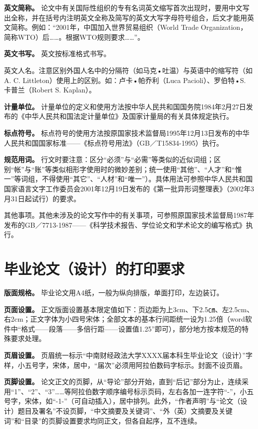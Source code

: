 \documentclass[doublesided]{Style/ucasthesis}%
\begin{document}
\textbf{英文简称。} 论文中有关国际性组织的专有名词英文缩写首次出现时，要用中文写出全称，并在括号内注明英文全称及简写的英文大写字母符号组合，后文才能用英文简称。例如：``2001年，中国加入世界贸易组织（World Trade Organization，简称WTO）后\ldots{}\ldots{}。根据WTO规则要求\ldots{}\ldots{}''。

\textbf{英文书写。} 英文按标准格式书写。

英文人名。注意区别外国人名中的分隔符（如马克•吐温）与英语中的缩写符（如A. C. Littleton）使用上的区别。如：卢卡•帕乔利（Luca Pacioli）、罗伯特•S. 卡普兰（Robert S. Kaplan）。

\textbf{计量单位。} 计量单位的定义和使用方法按中华人民共和国国务院1984年2月27日发布的《中华人民共和国法定计量单位》及国家计量局的有关具体规定执行。

\textbf{标点符号。} 标点符号的使用方法按原国家技术监督局1995年12月13日发布的中华人民共和国国家标准------《标点符号用法》（GB／T15834-1995）执行。

\textbf{规范用词。} 行文时要注意：区分``必须''与``必需''等类似的近似词组；区别``帐''与``账''等类似相形字使用时的微妙差别；统一使用``其他''、``人才''和``惟一''等词组，不得使用``其它''、``人材''和``唯一''）。具体用法可参照中华人民共和国国家语言文字工作委员会2001年12月19日发布的《第一批异形词整理表》（2002年3月31日起试行）的要求。

其他事项。其他未涉及的论文写作中的有关事项，可参照原国家技术监督局1987年发布的GB／7713-1987------《科学技术报告、学位论文和学术论文的编写格式》执行。

\hypertarget{section-34}{%
\section{毕业论文（设计）的打印要求}\label{section-34}}

\textbf{版面规格。} 毕业论文用A4纸，一般为纵向排版，单面打印，左边装订。

\textbf{页面设置。} 正文版面设置基本限定值如下：页边距为上3cm、下2.5㎝、左2.5cm、右2cm；正文字体为小四号宋体；全部文本的基本行间距统一设为1.25倍（word软件中``格式------段落------多倍行距------设置值1.25''即可），部分地方按本规范的特殊要求处理。

\textbf{页眉设置。} 页眉统一标示``中南财经政法大学XXXX届本科生毕业论文（设计）''字样，小五号字，宋体，居中，``届次''必须用阿拉伯数码字标示。封面不设页眉。

\textbf{页脚设置。} 论文正文的页脚，从``导论''部分开始，直到``后记''部分为止，连续采用``1''、``2''、``3''\ldots{}\ldots{}等阿拉伯数字顺序编号标示页码，左右各加一连字符``-''，小五号字，宋体，如``-1-''（可自动插入），居中排列。此外，``作者声明''与``论文（设计）题目及署名''不设页脚，``中文摘要及关键词''、``外（英）文摘要及关键词''和``目录''的页脚设置要求均同正文，但各自起序，互不连续。
\end{document}
